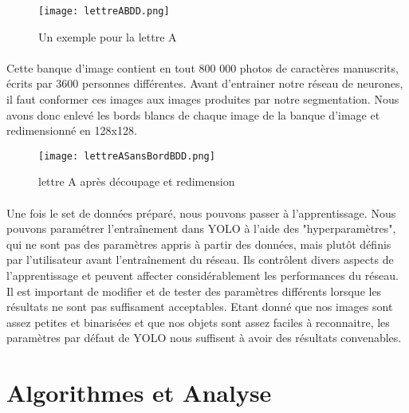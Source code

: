 \documentclass[a4paper]{article}
\begin{document}
			\begin{figure}[h!]
				\centering
				\texttt{[image: lettreABDD.png]}
				\caption{Un exemple pour la lettre A}
				\label{fig:BDDNIST}
			\end{figure}
		
			\paragraph{} Cette banque d'image contient en tout 800 000 photos de caractères manuscrits, écrits par 3600 personnes différentes. Avant d'entrainer notre réseau de neurones,
			il faut conformer ces images aux images produites par notre segmentation. Nous avons donc enlevé les bords blancs de chaque image de la banque d'image et redimensionné en 128x128.


			\begin{figure}[h!]
				\centering
				\texttt{[image: lettreASansBordBDD.png]}
				\caption{lettre A après découpage et redimension}
				\label{fig:BDDNISTsansBord}
			\end{figure}

			\paragraph{} Une fois le set de données préparé, nous pouvons passer à l'apprentissage.
			Nous pouvons paramétrer l'entraînement dans YOLO à l'aide des "hyperparamètres", qui ne sont pas des paramètres appris à partir des données, mais plutôt définis par l'utilisateur avant l'entraînement du réseau. Ils contrôlent divers aspects de l'apprentissage et peuvent affecter considérablement les performances du réseau.
			Il est important de modifier et de tester des paramètres différents lorsque les résultats ne sont pas suffisament acceptables.
			Etant donné que nos images sont assez petites et binarisées et que nos objets sont assez faciles à reconnaitre, les paramètres par défaut de YOLO nous suffisent à avoir des résultats convenables.




	
	\section{Algorithmes et Analyse}
\end{document}
